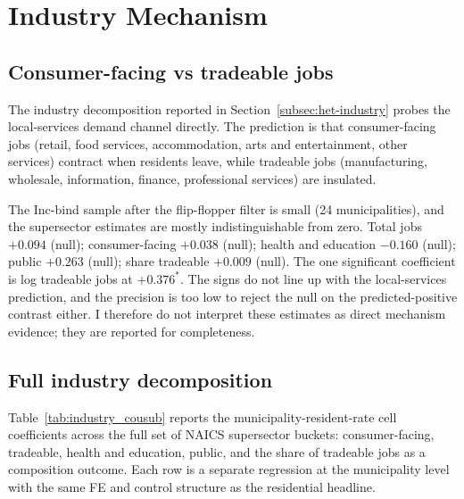 \documentclass[12pt]{article}
\begin{document}




\section{Industry Mechanism}
\label{app:industry}

\subsection{Consumer-facing vs tradeable jobs}
\label{app:industry-consumer}

The industry decomposition reported in
Section~\ref{subsec:het-industry} probes the local-services demand
channel directly. The prediction is that consumer-facing jobs
(retail, food services, accommodation, arts and entertainment,
other services) contract when residents leave, while tradeable
jobs (manufacturing, wholesale, information, finance, professional
services) are insulated.

The Inc-bind sample after the flip-flopper filter is small (24
municipalities), and the supersector estimates are mostly
indistinguishable from zero. Total jobs $+0.094$ (null);
consumer-facing $+0.038$ (null); health and education $-0.160$
(null); public $+0.263$ (null); share tradeable $+0.009$ (null).
The one significant coefficient is log tradeable jobs at $+0.376^{*}$.
The signs do not line up with the local-services prediction, and
the precision is too low to reject the null on the predicted-positive
contrast either. I therefore do not interpret these estimates as
direct mechanism evidence; they are reported for completeness.

\subsection{Full industry decomposition}
\label{app:industry-full}

Table~\ref{tab:industry_cousub} reports the municipality-resident-rate
cell coefficients across the full set of NAICS supersector buckets:
consumer-facing, tradeable, health and education, public, and the
share of tradeable jobs as a composition outcome. Each row is a
separate regression at the municipality level with the same FE and
control structure as the residential headline.
\end{document}
